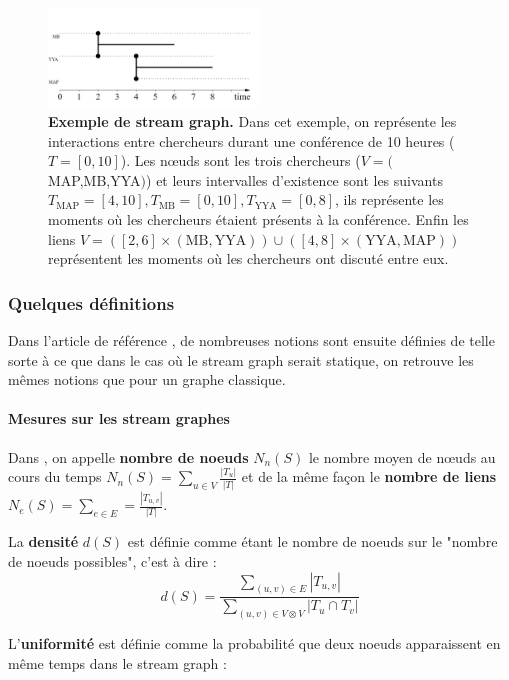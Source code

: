\documentclass[11pt,a4paper]{article}
\theoremstyle{definition}
\theoremstyle{remark}
\theoremstyle{remark}
\begin{document}
\begin{figure}[H]
\centering
\includegraphics[width=0.5\textwidth]{exStreamGraph.JPG}
\caption{\textbf{Exemple de stream graph.} Dans cet exemple, on représente les interactions entre chercheurs durant une conférence de 10 heures ($T=[0,10]$). Les nœuds sont les trois chercheurs ($V=($MAP,MB,YYA$)$) et leurs intervalles d'existence sont les suivants $T_{\text{MAP}}=[4,10], T_{\text{MB}}=[0,10], T_{\text{YYA}}=[0,8]$, ils représente les moments où les chercheurs étaient présents à la conférence. Enfin les liens $V=([2,6]\times (\text{MB},\text{YYA})) \cup ([4,8]\times(\text{YYA},\text{MAP}))$ représentent les moments où les chercheurs ont discuté entre eux.}
\end{figure}




\subsubsection{Quelques définitions}

Dans l'article de référence \cite{stream}, de nombreuses notions sont ensuite définies de telle sorte à ce que dans le cas où le stream graph serait statique, on retrouve les mêmes notions que pour un graphe classique.

\paragraph{Mesures sur les stream graphes}

Dans \cite{stream}, on appelle \textbf{nombre de noeuds} $N_n(S)$ le nombre moyen de nœuds au cours du temps $N_n(S) = \sum_{u\in V}\frac{|T_u|}{|T|}$ et de la même façon le \textbf{nombre de liens} $N_e(S) = \sum_{e \in E} = \frac{|T_{u,v}|}{|T|}$.

La \textbf{densité} $d(S)$ est définie comme étant le nombre de noeuds sur le "nombre de noeuds possibles", c'est à dire :
$$
d(S) = \frac{\sum_{(u,v)\in E} |T_{u,v}|}{\sum_{(u,v)\in V\otimes V} |T_u \cap T_v|}
$$

L'\textbf{uniformité} est définie comme la probabilité que deux noeuds apparaissent en même temps dans le stream graph :
\end{document}
